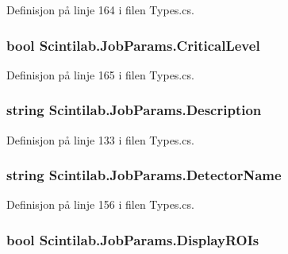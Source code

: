 Definisjon på linje 164 i filen Types.\+cs.

\hypertarget{class_scintilab_1_1_job_params_ac831d3241123c1bf2230d1e4c19f4c79}{
\subsubsection[{Critical\+Level}]{\setlength{\rightskip}{0pt plus 5cm}bool Scintilab.\+Job\+Params.\+Critical\+Level}}\label{class_scintilab_1_1_job_params_ac831d3241123c1bf2230d1e4c19f4c79}


Definisjon på linje 165 i filen Types.\+cs.

\hypertarget{class_scintilab_1_1_job_params_aebad6b202dfcdac00b50fcc16b182c06}{
\subsubsection[{Description}]{\setlength{\rightskip}{0pt plus 5cm}string Scintilab.\+Job\+Params.\+Description}}\label{class_scintilab_1_1_job_params_aebad6b202dfcdac00b50fcc16b182c06}


Definisjon på linje 133 i filen Types.\+cs.

\hypertarget{class_scintilab_1_1_job_params_abbaa53404bec76bbacb7868c585a1bf7}{
\subsubsection[{Detector\+Name}]{\setlength{\rightskip}{0pt plus 5cm}string Scintilab.\+Job\+Params.\+Detector\+Name}}\label{class_scintilab_1_1_job_params_abbaa53404bec76bbacb7868c585a1bf7}


Definisjon på linje 156 i filen Types.\+cs.

\hypertarget{class_scintilab_1_1_job_params_a6db9db51477c56293619f73e0355d1da}{
\subsubsection[{Display\+R\+O\+Is}]{\setlength{\rightskip}{0pt plus 5cm}bool Scintilab.\+Job\+Params.\+Display\+R\+O\+Is}}\label{class_scintilab_1_1_job_params_a6db9db51477c56293619f73e0355d1da}


